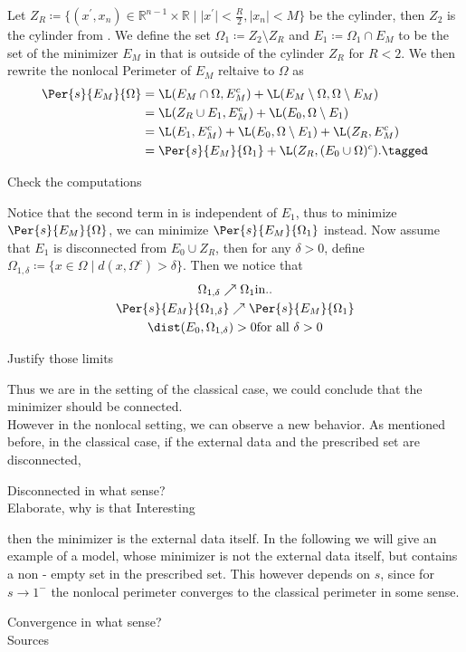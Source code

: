 Let \( Z_R \coloneqq \{(x^\prime, x_n) \in \mathbb{R}^{n - 1} \times \mathbb{R} \mid \lvert
x^\prime \rvert < \frac{R}{2}, \lvert x_n \rvert < M \} \) be the cylinder, then \( Z_2 \)
is the cylinder from . We define the set \( \Omega_1 \coloneqq Z_2
\setminus Z_R \) and \( E_1 \coloneqq \Omega_1 \cap E_M \) to be the set of the minimizer
\( E_M \) in  that is outside of the cylinder \( Z_R \) for \( R < 2 \). We
then rewrite the nonlocal Perimeter of \( E_M \) reltaive to \( \Omega \) as
\begin{align*}
	\Per{s}{E_M}{\Omega}
	 & = \L(E_M \cap \Omega, E_M^c) + \L(E_M \setminus \Omega, \Omega \setminus E_M) \\
	 & = \L(Z_R \cup E_1, E_M^c) + \L(E_0, \Omega \setminus E_1) \\
	 & = \L(E_1, E_M^c) + \L(E_0, \Omega \setminus E_1) + \L(Z_R, E_M^c) \\
	 & = \Per{s}{E_M}{\Omega_1} + \L(Z_R, (E_0 \cup \Omega)^c). \tagged\label{eq:201}
\end{align*}
\begin{TODO}
	Check the computations
\end{TODO}
Notice that the second term in  is independent of \( E_1 \), thus to minimize
\( \Per{s}{E_M}{\Omega} \), we can minimize \( \Per{s}{E_M}{\Omega_1} \) instead. Now
assume that \( E_1 \) is disconnected from \( E_0 \cup Z_R \), then for any \( \delta > 0
\), define \( \Omega_{1, \delta}\coloneqq \{x \in \Omega \mid d(x, \Omega^c) > \delta \}
\). Then we notice that
\begin{gather*}
	\Omega_{1, \delta} \nearrow \Omega_1 \text{in..} \\
	\Per{s}{E_M}{\Omega_{1, \delta}} \nearrow \Per{s}{E_M}{\Omega_1} \\
	\dist(E_0, \Omega_{1, \delta}) > 0 \text{for all~} \delta > 0 \\
\end{gather*}
\begin{TODO}
	Justify those limits
\end{TODO}
Thus we are in the setting of the classical case, we could conclude that the minimizer
should be connected. \\
However in the nonlocal setting, we can observe a new behavior. As mentioned before, in
the classical case, if the external data and the prescribed set are disconnected,
\begin{TODO}
	Disconnected in what sense?\\
	Elaborate, why is that Interesting
\end{TODO}
then the minimizer is the external data itself. In the following we will give an example
of a model, whose minimizer is not the external data itself, but contains a non - empty set
in the prescribed set. This however depends on \( s \), since for \( s \to 1^ - \) the
nonlocal perimeter converges to the classical perimeter in some sense.
\begin{TODO}
	Convergence in what sense?\\
	Sources
\end{TODO}

